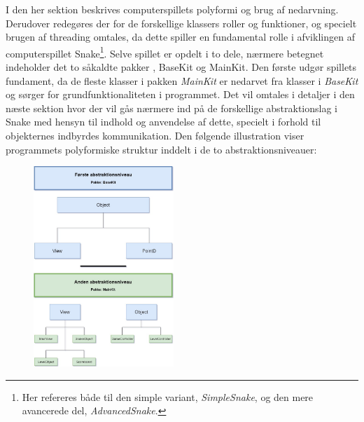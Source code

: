 \documentclass[]{article}
\begin{document}
I den her sektion beskrives computerspillets polyformi og brug af nedarvning. Derudover redegøres der for de forskellige klassers roller og funktioner, og specielt brugen af threading omtales, da dette spiller en fundamental rolle i afviklingen af computerspillet Snake\footnote{Her refereres både til den simple variant, \textit{SimpleSnake}, og den mere avancerede del, \textit{AdvancedSnake}.}.
Selve spillet er opdelt i to dele, nærmere betegnet indeholder det to såkaldte pakker , BaseKit og MainKit. Den første udgør spillets fundament, da de fleste klasser i pakken \textit{MainKit} er nedarvet fra klasser i \textit{BaseKit} og sørger for grundfunktionaliteten i programmet. Det vil omtales i detaljer i den næste sektion hvor der vil gås nærmere ind på de forskellige abstraktionslag i Snake med hensyn til indhold og anvendelse af dette, specielt i forhold til objekternes indbyrdes kommunikation. Den følgende illustration viser programmets polyformiske struktur inddelt i de to abstraktionsniveauer:

\begin{figure}[h!]
	\centering
	\includegraphics[width=200px]{Abstraktions_diagram.jpg}
	\label{fig:diagram}
\end{figure}
\end{document}
